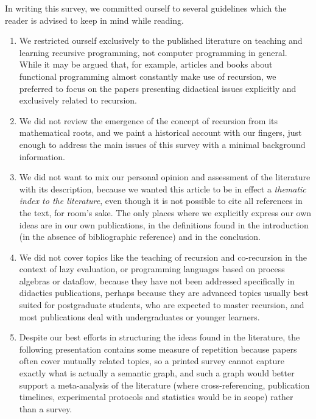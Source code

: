 \documentclass[11pt,a4paper]{article}
\begin{document}
In writing this survey, we committed ourself to several guidelines
which the reader is advised to keep in mind while reading.
\begin{enumerate}

  \item We restricted ourself exclusively to the published literature
    on teaching and learning recursive programming, not computer
    programming in general. While it may be argued that, for example,
    articles and books about functional programming almost constantly
    make use of recursion, we preferred to focus on the papers
    presenting didactical issues explicitly and exclusively related to
    recursion.

  \item We did not review the emergence of the concept of recursion
    from its mathematical roots, and we paint a historical account
    with our fingers, just enough to address the main issues of this
    survey with a minimal background information.

  \item We did not want to mix our personal opinion and assessment of
    the literature with its description, because we wanted this
    article to be in effect a \emph{thematic index to the literature},
    even though it is not possible to cite all references in the text,
    for room's sake. The only places where we explicitly express our
    own ideas are in our own publications, in the definitions found in
    the introduction (in the absence of bibliographic reference) and
    in the conclusion.

  \item We did not cover topics like the teaching of recursion and
    co\hyp{}recursion in the context of lazy evaluation, or
    programming languages based on process algebras or dataflow,
    because they have not been addressed specifically in didactics
    publications, perhaps because they are advanced topics usually
    best suited for postgraduate students, who are expected to master
    recursion, and most publications deal with undergraduates or
    younger learners.

  \item Despite our best efforts in structuring the ideas found in the
    literature, the following presentation contains some measure of
    repetition because papers often cover mutually related topics, so
    a printed survey cannot capture exactly what is actually a
    semantic graph, and such a graph would better support a
    meta\hyp{}analysis of the literature (where
    cross\hyp{}referencing, publication timelines, experimental
    protocols and statistics would be in scope) rather than a survey.

\end{enumerate}
\end{document}
